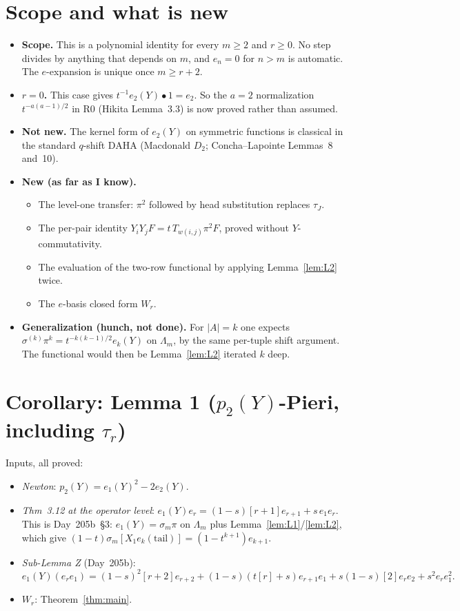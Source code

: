 \documentclass[11pt]{amsart}
\theoremstyle{remark}
\newcommand{\tn}[1]{[#1]}
\begin{document}
\section{Scope and what is new}\label{sec:scope}

\begin{itemize}
\item \textbf{Scope.} This is a polynomial identity for every $m\ge2$ and $r\ge0$. No step divides by anything that depends on $m$, and $e_n = 0$ for $n>m$ is automatic. The $e$-expansion is unique once $m\ge r+2$.
\item \textbf{$r=0$.} This case gives $t^{-1}e_2(Y)\bullet1 = e_2$. So the $a=2$ normalization $t^{-a(a-1)/2}$ in R0 (Hikita Lemma~3.3) is now proved rather than assumed.
\item \textbf{Not new.} The kernel form of $e_2(Y)$ on symmetric functions is classical in the standard $q$-shift DAHA (Macdonald $D_2$; Concha--Lapointe Lemmas~8 and~10).
\item \textbf{New (as far as I know).}
  \begin{itemize}
  \item The level-one transfer: $\pi^2$ followed by head substitution replaces $\tau_J$.
  \item The per-pair identity $Y_iY_jF = t\,T_{w(i,j)}\pi^2F$, proved without $Y$-commutativity.
  \item The evaluation of the two-row functional by applying Lemma~\ref{lem:L2} twice.
  \item The $e$-basis closed form $W_r$.
  \end{itemize}
\item \textbf{Generalization (hunch, not done).} For $|A|=k$ one expects $\sigma^{(k)}\pi^k = t^{-k(k-1)/2}e_k(Y)$ on $\Lambda_m$, by the same per-tuple shift argument. The functional would then be Lemma~\ref{lem:L2} iterated $k$ deep.
\end{itemize}

\section{Corollary: Lemma 1 ($p_2(Y)$-Pieri, including $\tau_r$)}\label{sec:cor}

Inputs, all proved:
\begin{itemize}
\item \emph{Newton}: $p_2(Y) = e_1(Y)^2 - 2e_2(Y)$.
\item \emph{Thm~3.12 at the operator level}: $e_1(Y)e_r = (1-s)\tn{r+1}e_{r+1} + s\,e_1e_r$. This is Day~205b~\S3: $e_1(Y) = \sigma_m\pi$ on $\Lambda_m$ plus Lemma~\ref{lem:L1}/\ref{lem:L2}, which give $(1-t)\sigma_m[X_1e_k(\text{tail})] = (1-t^{k+1})e_{k+1}$.
\item \emph{Sub-Lemma Z} (Day~205b):
\[
e_1(Y)(e_re_1) = (1-s)^2\tn{r+2}e_{r+2} + (1-s)(t\tn{r}+s)e_{r+1}e_1 + s(1-s)\tn{2}e_re_2 + s^2e_re_1^2.
\]
\item \emph{$W_r$}: Theorem~\ref{thm:main}.
\end{itemize}
\end{document}
